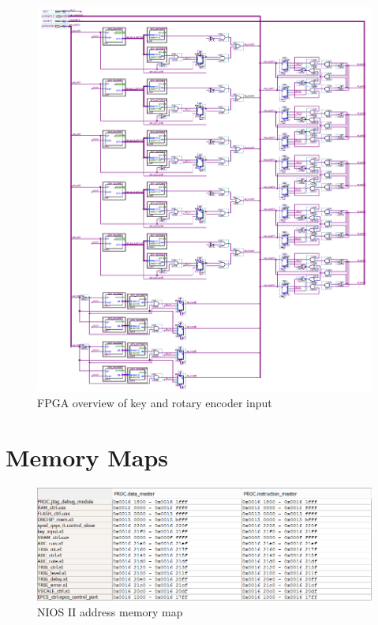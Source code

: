 \begin{appendices}
\begin{figure}[ht!]
    \centering
    \includegraphics[width=6in]{fpga_logic/keys_overview.png}
		\caption{FPGA overview of key and rotary encoder input}
\end{figure}

\chapter{Memory Maps} \label{App:memorymaps}

\begin{figure}[ht!]
    \centering
    \includegraphics[width=6in]{fpga_logic/address_map.png}
		\caption{NIOS II address memory map}
\end{figure}


\end{appendices}

